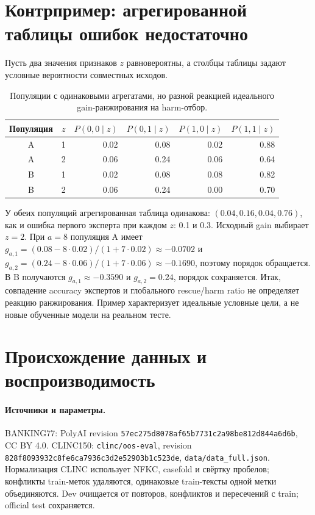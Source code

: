 \section{Контрпример: агрегированной таблицы ошибок недостаточно}
Пусть два значения признаков $z$ равновероятны, а столбцы
таблицы задают условные вероятности совместных исходов.
\begin{table}[htbp]\centering\small
\caption{Популяции с одинаковыми агрегатами, но разной реакцией
идеального gain-ранжирования на harm-отбор.}
\begin{tabular}{ccrrrr}
\toprule
Популяция & $z$ & $P(0,0\mid z)$ & $P(0,1\mid z)$ & $P(1,0\mid z)$ & $P(1,1\mid z)$ \\
\midrule
A & 1 & 0.02 & 0.08 & 0.02 & 0.88 \\
A & 2 & 0.06 & 0.24 & 0.06 & 0.64 \\
B & 1 & 0.02 & 0.08 & 0.08 & 0.82 \\
B & 2 & 0.06 & 0.24 & 0.00 & 0.70 \\
\bottomrule
\end{tabular}
\end{table}

У обеих популяций агрегированная таблица одинакова:
$(0.04,0.16,0.04,0.76)$, как и ошибка первого эксперта
при каждом $z$: 0.1 и 0.3. Исходный gain выбирает $z=2$.
При $a=8$ популяция A имеет
$g_{a,1}=(0.08-8\cdot0.02)/(1+7\cdot0.02)\approx-0.0702$
и $g_{a,2}=(0.24-8\cdot0.06)/(1+7\cdot0.06)\approx-0.1690$,
поэтому порядок обращается. В B получаются
$g_{a,1}\approx-0.3590$ и $g_{a,2}=0.24$, порядок сохраняется.
Итак, совпадение accuracy экспертов и глобального rescue/harm ratio
не определяет реакцию ранжирования. Пример характеризует
идеальные условные цели, а не новые обученные модели на реальном тесте.

\section{Происхождение данных и воспроизводимость}
\paragraph{Источники и параметры.}
BANKING77: PolyAI revision
\texttt{57ec275d8078af65b7731c2a98be812d844a6d6b}, CC BY 4.0.
CLINC150: \texttt{clinc/oos-eval}, revision
\texttt{828f8093932c8fe6ca7936c3d2e52903b1c523de},
\texttt{data/data\_full.json}. Нормализация CLINC использует
NFKC, casefold и свёртку пробелов; конфликты train-меток удаляются,
одинаковые train-тексты одной метки объединяются. Dev очищается
от повторов, конфликтов и пересечений с train; official test сохраняется.

